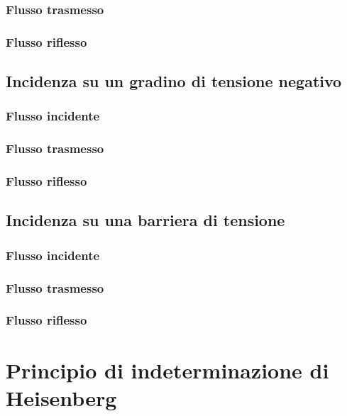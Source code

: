 \documentclass[10pt,a4paper]{report}
\begin{document}
		\subsection{Flusso trasmesso}

		\subsection{Flusso riflesso}

	
	\section{Incidenza su un gradino di tensione negativo}


		\subsection{Flusso incidente}

		\subsection{Flusso trasmesso}

		\subsection{Flusso riflesso}

	\section{Incidenza su una barriera di tensione}

		\subsection{Flusso incidente}

		\subsection{Flusso trasmesso}

		\subsection{Flusso riflesso}


\chapter{Principio di indeterminazione di Heisenberg}
\end{document}
